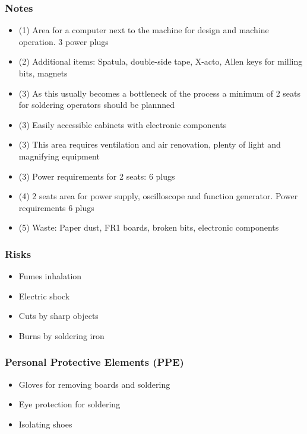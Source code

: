 \documentclass[a4paper,12pt,titlepage]{article}
\begin{document}
\subsubsection*{Notes}
\begin{itemize}
\item (1) Area for a computer next to the machine for design and machine operation. 3 power plugs
\item (2) Additional items: Spatula, double-side tape, X-acto, Allen keys for milling bits, magnets
\item (3) As this usually becomes a bottleneck of the process a minimum of 2 seats for soldering operators should be plannned
\item (3) Easily accessible cabinets with electronic components
\item (3) This area requires ventilation and air renovation, plenty of light and magnifying equipment
\item (3) Power requirements for 2 seats: 6 plugs
\item (4) 2 seats area for power supply, oscilloscope and function generator. Power requirements 6 plugs
\item (5) Waste: Paper dust, FR1 boards, broken bits, electronic components
\end{itemize}
\subsubsection*{Risks}
\begin{itemize}
\item Fumes inhalation
\item Electric shock
\item Cuts by sharp objects
\item Burns by soldering iron
\end{itemize}
\subsubsection*{Personal Protective Elements (PPE)}
\begin{itemize}
\item Gloves for removing boards and soldering
\item Eye protection for soldering
\item Isolating shoes
\end{itemize}
\clearpage
\end{document}
